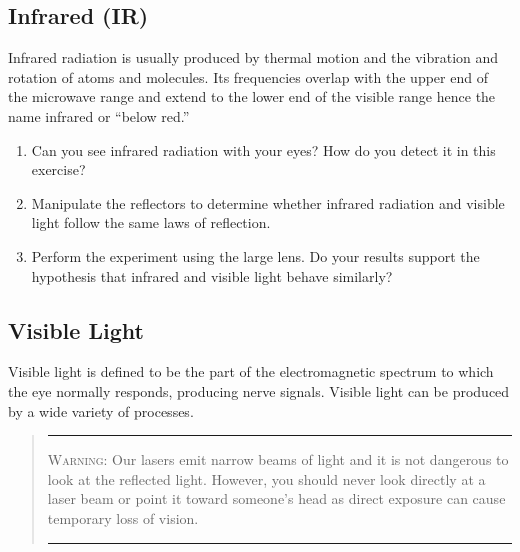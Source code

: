 \subsection{Infrared (IR)}
Infrared radiation is usually produced by thermal motion and the vibration and rotation of atoms and molecules.  Its frequencies overlap with the upper end of the microwave range and extend to the lower end of the visible range hence the name infrared or ``below red.''
\begin{enumerate}
	\item Can you see infrared radiation with your eyes?  How do you detect it in this exercise?  
	\item Manipulate the reflectors to determine whether infrared radiation and visible light follow the same laws of reflection.  
	\item Perform the experiment using the large lens.  Do your results support the hypothesis that infrared and visible light behave similarly?
\end{enumerate}
	
\subsection{Visible Light} 
Visible light is defined to be the part of the electromagnetic spectrum to which the eye normally responds, producing nerve signals.  Visible light can be produced by a wide variety of processes.

	\begin{quote}
	\vspace{1em}
	\hrule
	\textsc{Warning:} Our lasers emit narrow beams of light and it is not dangerous to look at the reflected light.  However, you should never look directly at a laser beam or point it toward someone's head as direct exposure can cause temporary loss of vision.
	\hrule
	\end{quote}
	
